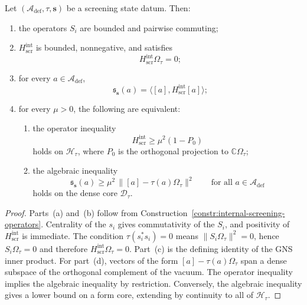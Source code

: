 \begin{proposition}
\label{prop:internal-screening-form}
Let $(\mathcal A_{\mathrm{def}},\tau,\mathbf s)$ be a screening state datum.
Then:
\begin{enumerate}[label=(\alph*)]
\item the operators $S_i$ are bounded and pairwise commuting;
\item $H_{\mathrm{scr}}^{\mathrm{int}}$ is bounded, nonnegative, and satisfies
\[
H_{\mathrm{scr}}^{\mathrm{int}}\Omega_\tau=0;
\]
\item for every $a\in \mathcal A_{\mathrm{def}}$,
\[
\mathfrak s_{\mathbf s}(a)=\bigl\langle [a],H_{\mathrm{scr}}^{\mathrm{int}}[a]\bigr\rangle;
\]
\item for every $\mu>0$, the following are equivalent:
\begin{enumerate}[label=(\arabic*)]
\item the operator inequality
\[
H_{\mathrm{scr}}^{\mathrm{int}}\ge \mu^2(1-P_0)
\]
holds on $\mathcal H_\tau$, where $P_0$ is the orthogonal projection to $\mathbb C\Omega_\tau$;
\item the algebraic inequality
\[
\mathfrak s_{\mathbf s}(a)\ge \mu^2\,\bigl\|[a]-\tau(a)\Omega_\tau\bigr\|^2
\qquad\text{for all }a\in \mathcal A_{\mathrm{def}}
\]
holds on the dense core $\mathcal D_\tau$.
\end{enumerate}
\end{enumerate}
\end{proposition}

\begin{proof}
Parts~(a) and~(b) follow from Construction~\ref{constr:internal-screening-operators}.
Centrality of the $s_i$ gives commutativity of the $S_i$, and positivity of $H_{\mathrm{scr}}^{\mathrm{int}}$
is immediate. The condition $\tau(s_i^*s_i)=0$ means
$\|S_i\Omega_\tau\|^2=0$, hence $S_i\Omega_\tau=0$ and therefore
$H_{\mathrm{scr}}^{\mathrm{int}}\Omega_\tau=0$.
Part~(c) is the defining identity of the GNS inner product.
For part~(d), vectors of the form
$[a]-\tau(a)\Omega_\tau$ span a dense subspace of the orthogonal complement of the vacuum.
The operator inequality implies the algebraic inequality by restriction.
Conversely, the algebraic inequality gives a lower bound on a form core, extending by continuity to all of $\mathcal H_\tau$.
\end{proof}

